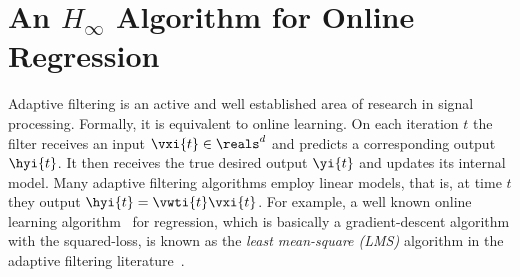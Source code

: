\chapter{An $H_\infty$ Algorithm for Online Regression}
\label{H8_sec}

Adaptive filtering is an active and well established area of research
in signal processing. Formally, it is equivalent to online learning. On
each iteration $t$ the filter receives an input $\vxi{t}\in\reals^d$ and
predicts a corresponding output $\hyi{t}$. It then receives the true
desired output $\yi{t}$ and updates its internal model. Many adaptive
filtering algorithms employ linear models, that is, at time $t$ they
output $\hyi{t} = \vwti{t}\vxi{t}$. For
example, a well known online learning algorithm~\citep{WidrowHoff}
for regression, which is basically a gradient-descent algorithm with
the squared-loss, is known as the {\em least mean-square (LMS)}
algorithm in the adaptive filtering
literature~\citep{Sayed:2008:AF:1370975}.

